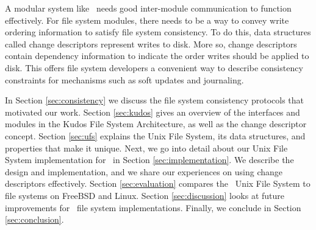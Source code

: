 A modular system like \Kudos\ needs good inter-module communication to function
effectively. For file system modules, there needs to be a way to convey 
write ordering information to satisfy file system consistency. To do this,
data structures called change descriptors represent writes to disk.
More so, change descriptors contain dependency information to indicate the
order writes should be applied to disk. This offers file system developers a
convenient way to describe consistency constraints for mechanisms such as soft
updates and journaling.

In Section \ref{sec:consistency} we discuss the file system consistency
protocols that motivated our work.
Section \ref{sec:kudos} gives an overview of the interfaces and modules in the
Kudos File System Architecture, as well as the change descriptor concept.
Section \ref{sec:ufs} explains the Unix File System, its data structures, and
properties that make it unique.
Next, we go into detail about our Unix File System implementation for
\Kudos\ in Section \ref{sec:implementation}. We describe the design and
implementation, and we share our experiences on using change descriptors
effectively.
Section \ref{sec:evaluation} compares the \Kudos\ Unix File System to file
systems on FreeBSD and Linux. 
Section \ref{sec:discussion} looks at future improvements for \Kudos\ file
system implementations.
Finally, we conclude in Section \ref{sec:conclusion}.


